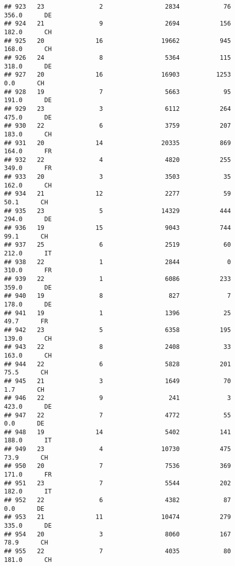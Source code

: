 \documentclass[
]{article}
\begin{document}
\begin{verbatim}
## 923   23               2                 2834            76    356.0      DE
## 924   21               9                 2694           156    182.0      CH
## 925   20              16                19662           945    168.0      CH
## 926   24               8                 5364           115    318.0      DE
## 927   20              16                16903          1253      0.0      CH
## 928   19               7                 5663            95    191.0      DE
## 929   23               3                 6112           264    475.0      DE
## 930   22               6                 3759           207    183.0      CH
## 931   20              14                20335           869    164.0      FR
## 932   22               4                 4820           255    349.0      FR
## 933   20               3                 3503            35    162.0      CH
## 934   21              12                 2277            59     50.1      CH
## 935   23               5                14329           444    294.0      DE
## 936   19              15                 9043           744     99.1      CH
## 937   25               6                 2519            60    212.0      IT
## 938   22               1                 2844             0    310.0      FR
## 939   22               1                 6086           233    359.0      DE
## 940   19               8                  827             7    178.0      DE
## 941   19               1                 1396            25     49.7      FR
## 942   23               5                 6358           195    139.0      CH
## 943   22               8                 2408            33    163.0      CH
## 944   22               6                 5828           201     75.5      CH
## 945   21               3                 1649            70      1.7      CH
## 946   22               9                  241             3    423.0      DE
## 947   22               7                 4772            55      0.0      DE
## 948   19              14                 5402           141    188.0      IT
## 949   23               4                10730           475     73.9      CH
## 950   20               7                 7536           369    171.0      FR
## 951   23               7                 5544           202    182.0      IT
## 952   22               6                 4382            87      0.0      DE
## 953   21              11                10474           279    335.0      DE
## 954   20               3                 8060           167     78.9      CH
## 955   22               7                 4035            80    181.0      CH

\end{verbatim}
\end{document}
